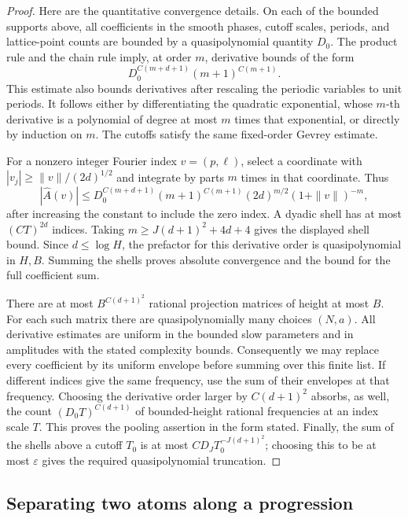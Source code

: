 \begin{proof}
Here are the quantitative convergence details.  On each of the bounded
supports above, all coefficients in the smooth phases, cutoff scales,
periods, and lattice-point counts are bounded by a quasipolynomial
quantity \(D_0\).  The product rule and the chain rule imply, at order
\(m\), derivative bounds of the form
\[
 D_0^{C(m+d+1)}(m+1)^{C(m+1)} .
\]
This estimate also bounds derivatives after rescaling the periodic
variables to unit periods.  It follows either by differentiating the
quadratic exponential, whose \(m\)-th derivative is a polynomial of
degree at most \(m\) times that exponential, or directly by induction
on \(m\).  The cutoffs satisfy the same fixed-order Gevrey estimate.

For a nonzero integer Fourier index \(v=(p,\ell)\), select a coordinate
with \(|v_j|\ge\|v\|/(2d)^{1/2}\) and integrate by parts \(m\) times
in that coordinate.  Thus
\[
 |\widehat A(v)|
 \le D_0^{C(m+d+1)}
       (m+1)^{C(m+1)}(2d)^{m/2}(1+\|v\|)^{-m},
\]
after increasing the constant to include the zero index.
A dyadic shell has at most \((CT)^{2d}\) indices.
Taking \(m\ge J(d+1)^2+4d+4\) gives the displayed shell bound.
Since \(d\le\log H\), the prefactor for this derivative order is
quasipolynomial in \(H,B\).  Summing the shells proves absolute
convergence and the bound for the full coefficient sum.

There are at most \(B^{C(d+1)^2}\) rational projection matrices
of height at most \(B\).
For each such matrix there are quasipolynomially many choices
\((N,a)\).  All derivative estimates are uniform in the bounded
slow parameters and in amplitudes with the stated complexity bounds.
Consequently we may replace every coefficient by its uniform envelope
before summing over this finite list.  If different indices give the
same frequency, use the sum of their envelopes at that frequency.
Choosing the derivative order larger by \(C(d+1)^2\) absorbs, as well,
the count \((D_0T)^{C(d+1)}\) of bounded-height rational frequencies
at an index scale \(T\).
This proves the pooling assertion in the form stated.
Finally, the sum of the shells above a cutoff \(T_0\) is at most
\(C D_JT_0^{-J(d+1)^2}\); choosing this to be at most
\(\varepsilon\) gives the required quasipolynomial truncation.
\end{proof}

\subsection{Separating two atoms along a progression}

